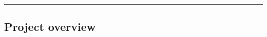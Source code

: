 \documentclass[a0,portrait]{a0poster}
\begin{document}
\vfill

\begin{center}\noindent\rule{1.0\linewidth}{0.05pt}\end{center}


\begin{multicols}{2}


\section*{Project overview}


\end{multicols}
\end{document}
